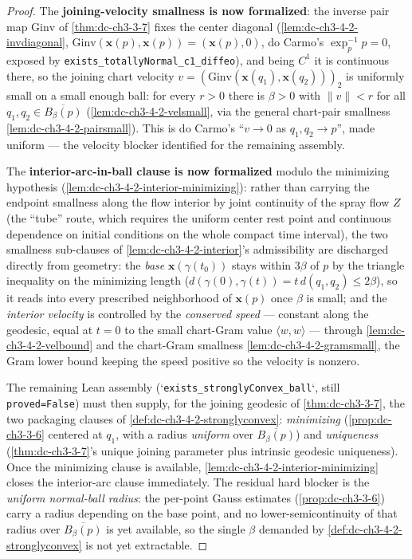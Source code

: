\begin{proof}
  The \textbf{joining-velocity smallness is now formalized}: the inverse pair map $\mathrm{Ginv}$ of
  \cref{thm:dc-ch3-3-7} fixes the center diagonal (\cref{lem:dc-ch3-4-2-invdiagonal},
  $\mathrm{Ginv}(\mathbf{x}(p),\mathbf{x}(p))=(\mathbf{x}(p),0)$, do Carmo's $\exp_p^{-1}p=0$, exposed by
  \texttt{exists\_totallyNormal\_c1\_diffeo}), and being $C^1$ it is continuous there, so the joining
  chart velocity $v=(\mathrm{Ginv}(\mathbf{x}(q_1),\mathbf{x}(q_2)))_2$ is uniformly small on a small
  enough ball: for every $r>0$ there is $\beta>0$ with $\|v\|<r$ for all
  $q_1,q_2\in\overline{B_\beta(p)}$ (\cref{lem:dc-ch3-4-2-velsmall}, via the general chart-pair smallness
  \cref{lem:dc-ch3-4-2-pairsmall}). This is do Carmo's ``$v\to0$ as $q_1,q_2\to p$'', made uniform — the
  velocity blocker identified for the remaining assembly.

  The \textbf{interior-arc-in-ball clause is now formalized} modulo the minimizing hypothesis
  (\cref{lem:dc-ch3-4-2-interior-minimizing}): rather than carrying the endpoint smallness along the
  flow interior by joint continuity of the spray flow $Z$ (the ``tube'' route, which requires the
  uniform center rest point and continuous dependence on initial conditions on the whole compact time
  interval), the two smallness sub-clauses of \cref{lem:dc-ch3-4-2-interior}'s admissibility are
  discharged directly from geometry: the \emph{base} $\mathbf{x}(\gamma(t_0))$ stays within $3\beta$
  of $p$ by the triangle inequality on the minimizing length
  ($d(\gamma(0),\gamma(t))=t\,d(q_1,q_2)\le2\beta$), so it reads into every prescribed neighborhood of
  $\mathbf{x}(p)$ once $\beta$ is small; and the \emph{interior velocity} is controlled by the
  \emph{conserved speed} — constant along the geodesic, equal at $t=0$ to the small chart-Gram value
  $\langle w,w\rangle$ — through \cref{lem:dc-ch3-4-2-velbound} and the chart-Gram smallness
  \cref{lem:dc-ch3-4-2-gramsmall}, the Gram lower bound keeping the speed positive so the velocity is
  nonzero.

  The remaining Lean assembly (`\texttt{exists\_stronglyConvex\_ball}`, still \texttt{proved=False})
  must then supply, for the joining geodesic of \cref{thm:dc-ch3-3-7}, the two packaging clauses of
  \cref{def:dc-ch3-4-2-stronglyconvex}: \emph{minimizing} (\cref{prop:dc-ch3-3-6} centered at $q_1$,
  with a radius \emph{uniform} over $\overline{B_\beta(p)}$) and \emph{uniqueness}
  (\cref{thm:dc-ch3-3-7}'s unique joining parameter plus intrinsic geodesic uniqueness). Once the
  minimizing clause is available, \cref{lem:dc-ch3-4-2-interior-minimizing} closes the interior-arc
  clause immediately. The residual hard blocker is the \emph{uniform normal-ball radius}: the
  per-point Gauss estimates (\cref{prop:dc-ch3-3-6}) carry a radius depending on the base point, and
  no lower-semicontinuity of that radius over $\overline{B_\beta(p)}$ is yet available, so the single
  $\beta$ demanded by \cref{def:dc-ch3-4-2-stronglyconvex} is not yet extractable.


\end{proof}
